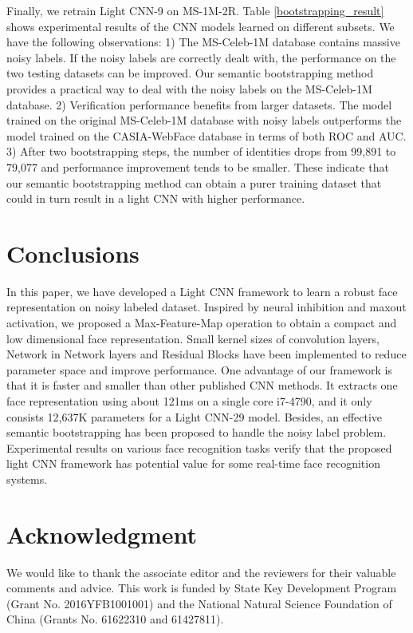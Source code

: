 \documentclass[journal,transmag]{IEEEtran}
\begin{document}
Finally, we retrain Light CNN-9 on MS-1M-2R. Table \ref{bootstrapping_result} shows experimental results of the CNN models learned on different subsets. We have the following observations: 1) The MS-Celeb-1M database contains massive noisy labels. If the noisy labels are correctly dealt with, the performance on the two testing datasets can be improved. Our semantic bootstrapping method provides a practical way to deal with the noisy labels on the MS-Celeb-1M database. 2) Verification performance benefits from larger datasets. The model trained on the original MS-Celeb-1M database with noisy labels outperforms the model trained on the CASIA-WebFace database in terms of both ROC and AUC. 3)  After two bootstrapping steps, the number of identities drops from 99,891 to 79,077 and performance improvement tends to be smaller. These indicate that our semantic bootstrapping method can obtain a purer training dataset that could in turn result in a light CNN with higher performance.

\section{Conclusions}
In this paper, we have developed a Light CNN framework to learn a robust face representation on noisy labeled dataset. Inspired by neural inhibition and maxout activation, we proposed a Max-Feature-Map operation to obtain a compact and low dimensional face representation. Small kernel sizes of convolution layers, Network in Network layers and Residual Blocks have been implemented to reduce parameter space and improve performance. One advantage of our framework is that it is faster and smaller than other published CNN methods. It extracts one face representation using about 121ms on a single core i7-4790, and it only consists 12,637K parameters for a Light CNN-29 model. Besides, an effective semantic bootstrapping has been proposed to handle the noisy label problem. Experimental results on various face recognition tasks verify that the proposed light CNN framework has potential value for some real-time face recognition systems.

\section*{Acknowledgment}

We would like to thank the associate editor and the reviewers for their valuable comments and advice. This work is funded by State Key Development Program (Grant No. 2016YFB1001001) and the National Natural Science Foundation of China (Grants No. 61622310 and 61427811).

{\small


}
\end{document}
